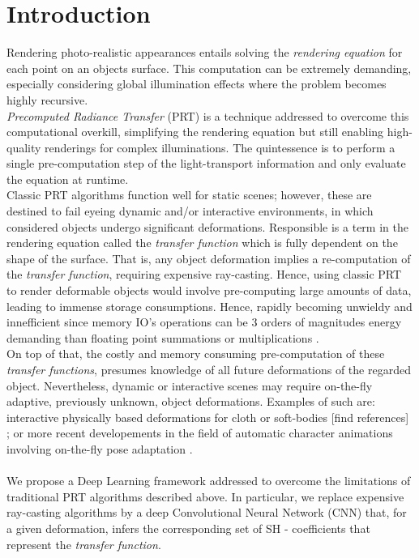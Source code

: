 \section{Introduction}

Rendering photo-realistic appearances entails solving the \textit{rendering equation} for each point on an objects surface. This computation can be extremely demanding, especially considering global illumination effects where the problem becomes highly recursive. \\
\textit{Precomputed Radiance Transfer} (PRT) is a technique addressed to overcome this computational overkill, simplifying the rendering equation but still enabling high-quality renderings for complex illuminations. The quintessence is to perform a single pre-computation step of the light-transport information and only evaluate the equation at runtime.\\
Classic PRT algorithms function well for static scenes; however, these are destined to fail eyeing dynamic and/or interactive environments, in which considered objects undergo significant deformations.
Responsible is a term in the rendering equation called the \textit{transfer function} which is fully dependent on the shape of the surface. That is, any object deformation implies a re-computation of the \textit{transfer function},  requiring expensive ray-casting. Hence, using classic PRT to render deformable objects would involve pre-computing large amounts of data, leading to immense storage consumptions. Hence, rapidly becoming unwieldy and innefficient since memory IO's operations can be 3 orders of magnitudes energy demanding than floating point summations or multiplications \cite{ComputingEnergy}. \\
On top of that, the costly and memory consuming pre-computation of these \textit{transfer functions}, presumes knowledge of all future deformations of the regarded object. Nevertheless, dynamic or interactive scenes may require on-the-fly adaptive, previously unknown, object deformations. Examples of such are: 
interactive physically based deformations for cloth or soft-bodies [find references] ; 
or more recent developements in the field of automatic character animations involving on-the-fly pose adaptation \cite{DeepHuman,Holden2017, QuadrupedMotion}. \\
\\
We propose a Deep Learning framework addressed to overcome the limitations of traditional PRT algorithms described above. In particular, we replace expensive ray-casting algorithms by a deep Convolutional Neural Network (CNN) that, for a given deformation, infers the corresponding set of SH - coefficients that represent the \textit{transfer function}. 
